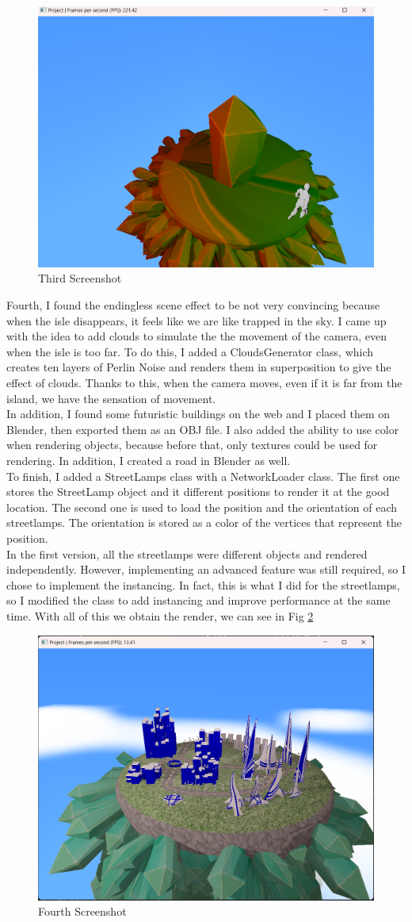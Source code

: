 \documentclass[acmtog,screen,review,nonacm]{acmart}
\begin{document}
\begin{figure}[H]
    \centering
    \includegraphics[width=0.5\linewidth]{save/Save3_09_12_2024.png}
    \caption{Third Screenshot}
    \label{fig:Fig 3}
\end{figure}

Fourth, I found the endingless scene effect to be not very convincing because when the isle disappears, it feels like we are like trapped in the sky. I came up with the idea to add clouds to simulate the the movement of the camera, even when the isle is too far. To do this, I added a CloudsGenerator class, which creates ten layers of Perlin Noise and renders them in superposition to give the effect of clouds. Thanks to this, when the camera moves, even if it is far from the island, we have the sensation of movement. \\
In addition, I found some futuristic buildings on the web and I placed them on Blender, then exported them as an OBJ file. I also added the ability to use color when rendering objects, because before that, only textures could be used for rendering. In addition, I created a road in Blender as well.
\\
 To finish, I added a StreetLamps class with a NetworkLoader class. The first one stores the StreetLamp object and it different positions to render it at the good location. The second one is used to load the position and the orientation of each streetlamps. The orientation is stored as a color of the vertices that represent the position. 
 \\
 In the first version, all the streetlamps were different objects and rendered independently. However, implementing an advanced feature was still required, so I chose to implement the instancing. In fact, this is what I did  for the streetlamps, so I modified the class to add instancing and improve performance at the same time.  With all of this we obtain the render, we can see in Fig \ref{fig:Fig 4} 

\begin{figure}[H]
    \centering
    \includegraphics[width=0.5\linewidth]{save/Save4_24_12_2024.png}
    \caption{Fourth Screenshot}
    \label{fig:Fig 4}
\end{figure}
\end{document}
